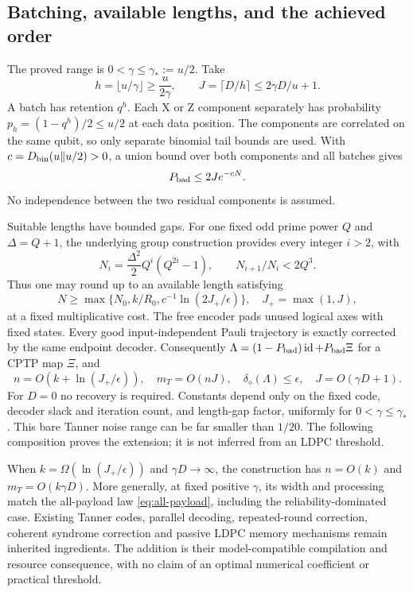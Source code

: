 \documentclass[11pt,a4paper]{article}
\numberwithin{equation}{section}
\theoremstyle{remark}\newtheorem*{remark}{Interpretation}
\newcommand{\id}{\operatorname{id}}
\newcommand{\eps}{\epsilon}
\newcommand{\dd}{\delta_{\diamond}}
\begin{document}
\subsection{Batching, available lengths, and the achieved order}
The proved range is $0<\gamma\le\gamma_*:=u/2$. Take
\[
h=\lfloor u/\gamma\rfloor\ge\frac{u}{2\gamma},\qquad
J=\lceil D/h\rceil\le2\gamma D/u+1.
\]
A batch has retention $q^h$. Each X or Z component separately has probability $p_h=(1-q^h)/2\le u/2$ at each data position. The components are correlated on the same qubit, so only separate binomial tail bounds are used. With $c=D_{\rm bin}(u\Vert u/2)>0$, a union bound over both components and all batches gives
\[
P_{\rm bad}\le2Je^{-cN}.
\]
No independence between the two residual components is assumed.

Suitable lengths have bounded gaps. For one fixed odd prime power $Q$ and $\Delta=Q+1$, the underlying group construction provides every integer $i>2$, with
\[
N_i=\frac{\Delta^2}{2}Q^i(Q^{2i}-1),\qquad
N_{i+1}/N_i<2Q^3.
\]
Thus one may round up to an available length satisfying
\[
N\ge\max\{N_0,k/R_0,c^{-1}\ln(2J_+/\eps)\},
\quad J_+=\max(1,J),
\]
at a fixed multiplicative cost. The free encoder pads unused logical axes with fixed states. Every good input-independent Pauli trajectory is exactly corrected by the same endpoint decoder. Consequently $\Lambda=(1-P_{\rm bad})\id+P_{\rm bad}\Xi$ for a CPTP map $\Xi$, and
\begin{equation}
\boxed{n=O(k+\ln(J_+/\eps)),\quad
m_T=O(nJ),\quad
\dd(\Lambda)\le\eps,\quad J=O(\gamma D+1).}
\label{eq:tanner-upper}
\end{equation}
For $D=0$ no recovery is required. Constants depend only on the fixed code, decoder slack and iteration count, and length-gap factor, uniformly for $0<\gamma\le\gamma_*$. This bare Tanner noise range can be far smaller than $1/20$. The following composition proves the extension; it is not inferred from an LDPC threshold.

When $k=\Omega(\ln(J_+/\eps))$ and $\gamma D\to\infty$, the construction has $n=O(k)$ and $m_T=O(k\gamma D)$. More generally, at fixed positive $\gamma$, its width and processing match the all-payload law \eqref{eq:all-payload}, including the reliability-dominated case. Existing Tanner codes, parallel decoding, repeated-round correction, coherent syndrome correction and passive LDPC memory mechanisms remain inherited ingredients. The addition is their model-compatible compilation and resource consequence, with no claim of an optimal numerical coefficient or practical threshold.
\end{document}
